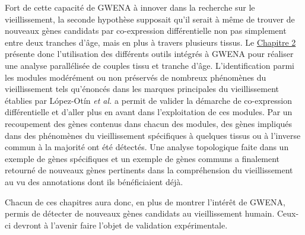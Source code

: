 Fort de cette capacité de GWENA à innover dans la recherche sur le vieillissement, la seconde hypothèse supposait qu'il serait à même de trouver de nouveaux gènes candidats par co-expression différentielle non pas simplement entre deux tranches d'âge, mais en plus à travers plusieurs tissus. Le \hyperref[chapter:multidim]{Chapitre 2} présente donc l'utilisation des différents outils intégrés à GWENA pour réaliser une analyse parallélisée de couples tissu et tranche d'âge. L'identification parmi les modules modérément ou non préservés de nombreux phénomènes du vieillissement tels qu'énoncés dans les marques principales du vieillissement établies par López-Otín \textit{et al.} a permit de valider la démarche de co-expression différentielle et d'aller plus en avant dans l'exploitation de ces modules. Par un recoupement des gènes contenus dans chacun des modules, des gènes impliqués dans des phénomènes du vieillissement spécifiques à quelques tissus ou à l'inverse commun à la majorité ont été détectés. Une analyse topologique faite dans un exemple de gènes spécifiques et un exemple de gènes communs a finalement retourné de nouveaux gènes pertinents dans la compréhension du vieillissement au vu des annotations dont ils bénéficiaient déjà.

Chacun de ces chapitres aura donc, en plus de montrer l'intérêt de GWENA, permis de détecter de nouveaux gènes candidats au vieillissement humain. Ceux-ci devront à l'avenir faire l'objet de validation expérimentale.

